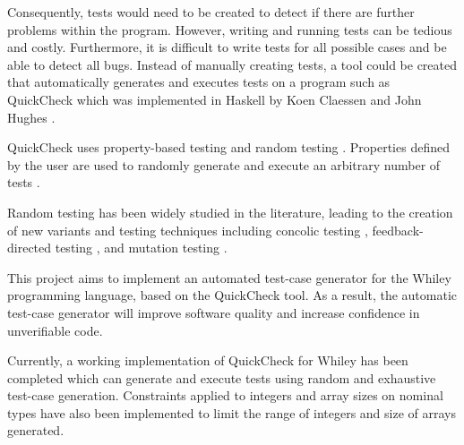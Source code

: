 Consequently, tests would need to be created to detect if there are further problems within the program. However, writing and running tests can be tedious and costly. Furthermore, it is difficult to write tests for all possible cases and be able to detect all bugs. Instead of manually creating tests, a tool could be created that automatically generates and executes tests on a program such as QuickCheck which was implemented in Haskell by Koen Claessen and John Hughes \cite{QClightweight}.

QuickCheck uses property-based testing and random testing \cite{QClightweight}. Properties defined by the user are used to randomly generate and execute an arbitrary number of tests \cite{QClightweight}. 

Random testing has been widely studied in the literature, leading to the creation of new variants and testing techniques including concolic testing \cite{CUTE}, feedback-directed testing \cite{randoopAll}, \cite{randoopJava} and mutation testing \cite{evoSuite}.


This project aims to implement an automated test-case generator for the Whiley programming language, based on the QuickCheck tool. As a result, the automatic test-case generator will improve software quality and increase confidence in unverifiable code. 

Currently, a working implementation of QuickCheck for Whiley has been completed which can generate and execute tests using random and exhaustive test-case generation. 
Constraints applied to integers and array sizes on nominal types have also been implemented to limit the range of integers and size of arrays generated.

